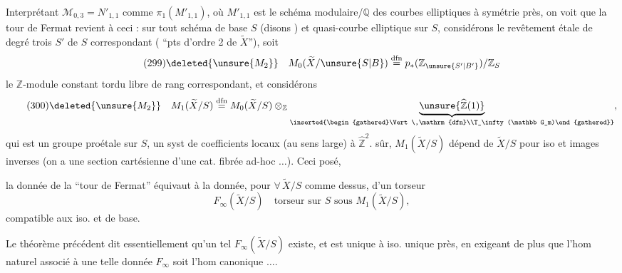 Interprétant $\mathcal M_{0,3}=N'_{1,1}$ comme $\pi_1(M'_{1,1})$, où $M'_{1,1}$ est le schéma modulaire/$\mathbb Q$ des courbes elliptiques à symétrie près, on voit que la tour de Fermat revient à ceci : sur tout schéma de base $S$ (disons ) et  quasi-courbe elliptique  sur $S$, considérons le revêtement étale de degré trois $S'$ de $S$ correspondant ( ``pts d'ordre 2 de $\widetilde X$''),  soit
\[
\tag{299}
\deleted{\unsure{M_2}}\quad M_0(\widetilde X/\unsure{S|B})\overset{\mathrm{dfn}}{=}p_*(\mathbb Z_{\unsure{S'|B'}})/\mathbb Z_S
\]
le $\mathbb Z$-module constant tordu libre de rang  correspondant, et considérons
\[
\tag{300}
\deleted{\unsure{M_2}}\quad M_1(\widetilde X/S)\overset{\mathrm{dfn}}{=}M_0(\widetilde X/S)\otimes_{\mathbb Z}\underbrace{\unsure{\widehat{\mathbb Z}(1)}}_{\inserted{\begin{gathered}\Vert\,\mathrm{dfn}\\T_\infty(\mathbb G_m)\end{gathered}}},
\]
qui est un groupe proétale sur $S$, un syst de coefficients locaux\unsure{;} (au sens large) à $\widehat{\mathbb Z}^{2}$.  sûr, $M_1(\widetilde X/S)$ dépend  de $\widetilde X/S$ pour iso et images inverses (on a une section cartésienne d'une cat. fibrée ad-hoc $\ldots$). Ceci posé,



la donnée de la ``tour de Fermat'' équivaut à la donnée, pour $\forall\,\widetilde X/S$ comme dessus, d'un torseur
\[
\tag{301}
F_\infty(\widetilde X/S)\quad\text{torseur sur }S\text{ sous }M_1(\widetilde X/S),
\]
compatible aux iso. et  de base.

Le théorème précédent dit essentiellement qu'un tel $F_\infty(\widetilde X/S)$ existe, et est unique à iso. unique près, en exigeant de plus que l'hom naturel
associé à une telle donnée $F_\infty$ soit l'hom canonique $\ldots$.

